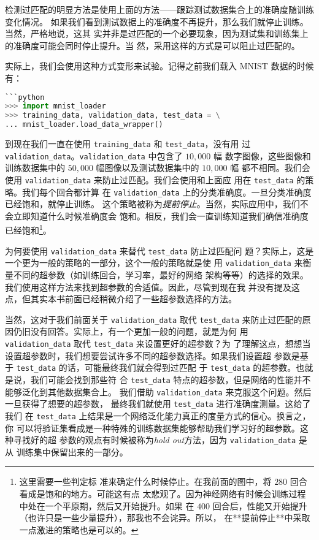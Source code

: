检测过匹配的明显方法是使用上面的方法——跟踪测试数据集合上的准确度随训练变化情况。
如果我们看到测试数据上的准确度不再提升，那么我们就停止训练。当然，严格地说，这其
实并非是过匹配的一个必要现象，因为测试集和训练集上的准确度可能会同时停止提升。当
然，采用这样的方式是可以阻止过匹配的。

实际上，我们会使用这种方式变形来试验。记得之前我们载入 MNIST 数据的时候有：

\begin{lstlisting}[language=Python]
```python
>>> import mnist_loader
>>> training_data, validation_data, test_data = \
... mnist_loader.load_data_wrapper()
\end{lstlisting}

到现在我们一直在使用 \lstinline!training_data! 和 \lstinline!test_data!，没有用
过 \lstinline!validation_data!。\lstinline!validation_data! 中包含了 $10,000$ 幅
数字图像，这些图像和训练数据集中的 $50,000$ 幅图像以及测试数据集中的 $10,000$ 幅
都不相同。我们会使用 \lstinline!validation_data! 来防止过匹配。我们会使用和上面应
用在 \lstinline!test_data! 的策略。我们每个回合都计算
在 \lstinline!validation_data! 上的分类准确度。一旦分类准确度已经饱和，就停止训练。
这个策略被称为\emph{提前停止}。当然，实际应用中，我们不会立即知道什么时候准确度会
饱和。相反，我们会一直训练知道我们确信准确度已经饱和\footnote{这里需要一些判定标
  准来确定什么时候停止。在我前面的图中，将 $280$ 回合看成是饱和的地方。可能这有点
  太悲观了。因为神经网络有时候会训练过程中处在一个平原期，然后又开始提升。如果
  在 $400$ 回合后，性能又开始提升（也许只是一些少量提升），那我也不会诧异。所以，
  在**提前停止**中采取一点激进的策略也是可以的。}。

为何要使用 \lstinline!validation_data! 来替代 \lstinline!test_data! 防止过匹配问
题？实际上，这是一个更为一般的策略的一部分，这个一般的策略就是使
用 \lstinline!validation_data! 来衡量不同的超参数（如训练回合，学习率，最好的网络
架构等等）的选择的效果。我们使用这样方法来找到超参数的合适值。因此，尽管到现在我
并没有提及这点，但其实本书前面已经稍微介绍了一些超参数选择的方法。

当然，这对于我们前面关于 \lstinline!validation_data! 取代 \lstinline!test_data!
来防止过匹配的原因仍旧没有回答。实际上，有一个更加一般的问题，就是为何
用 \lstinline!validation_data! 取代 \lstinline!test_data! 来设置更好的超参数？为
了理解这点，想想当设置超参数时，我们想要尝试许多不同的超参数选择。如果我们设置超
参数是基于 \lstinline!test_data! 的话，可能最终我们就会得到过匹配
于 \lstinline!test_data!  的超参数。也就是说，我们可能会找到那些符
合 \lstinline!test_data! 特点的超参数，但是网络的性能并不能够泛化到其他数据集合上。
我们借助 \lstinline!validation_data! 来克服这个问题。然后一旦获得了想要的超参数，
最终我们就使用 \lstinline!test_data! 进行准确度测量。这给了我们
在 \lstinline!test_data! 上结果是一个网络泛化能力真正的度量方式的信心。换言之，你
可以将验证集看成是一种特殊的训练数据集能够帮助我们学习好的超参数。这种寻找好的超
参数的观点有时候被称为\emph{hold out}方法，因为 \lstinline!validation_data! 是从
训练集中保留出来的一部分。


